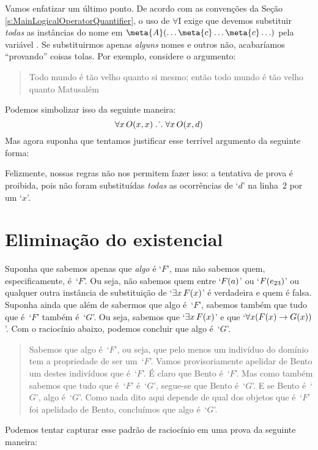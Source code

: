 Vamos enfatizar um último ponto. De acordo com as convenções da Seção \ref{s:MainLogicalOperatorQuantifier}, o uso de $\forall$I exige que devemos substituir  \emph{todas} as instâncias do nome  em $\meta{A}(\ldots \meta{c}\ldots\meta{c}\ldots)$ pela variável . Se substituirmos apenas \emph{alguns} nomes e outros não, acabaríamos ``provando'' coisas tolas. Por exemplo, considere o argumento:
	\begin{quote}
	Todo mundo é tão velho quanto si mesmo; então todo mundo é tão velho quanto Matusalém
	\end{quote}
Podemos simbolizar isso da seguinte maneira:
$$\forall x\,\mathord{O}(x,x) \mathrel{\ldotp\dot{}\,\ldotp} \forall x\,\mathord{O}(x,d)$$
Mas agora suponha que tentamos justificar esse terrível argumento da seguinte forma:
\begin{fitchproof}
\end{fitchproof}
Felizmente, nossas regras não nos permitem fazer isso: a tentativa de prova é proibida, pois não foram substituídas \emph{todas} as ocorrências de `$d$' na linha~$2$ por um `$x$'.

\section{Eliminação do existencial}
Suponha que sabemos apenas que \emph{algo}  é `$F$’, mas não sabemos quem, especificamente,  é~`$F$'.  Ou seja, não sabemos quem entre `$\mathord{F}(a)$’ ou `$\mathord{F}(e_{23})$’ ou qualquer outra instância de substituição de `$\exists x\,\mathord{F}(x)$’ é verdadeira e quem é falsa.  Suponha ainda que além de sabermos que algo  é~`$F$’, sabemos também que tudo que
é~`$F$' também é~`$G$'.  Ou seja, sabemos que `$\exists x\,\mathord{F}(x)$’ e que `$\forall x(\mathord{F}(x) \rightarrow \mathord{G}(x))$’. Com o raciocínio abaixo, podemos concluir que algo é~`$G$’.
 
\begin{quote}
Sabemos que algo é~`$F$', ou seja, que pelo menos um indivíduo do domínio tem a propriedade de ser um~`$F$'. Vamos provisoriamente apelidar de Bento um destes indivíduos que é~`$F$'. É claro que Bento é~`$F$'. Mas como também sabemos que tudo que é~`$F$' é~`$G$', segue-se que Bento é~`$G$'. E se Bento é~`$G$', algo é~`$G$'. Como nada dito aqui depende de qual dos objetos que é~`$F$’ foi apelidado de Bento, concluímos que algo é~`$G$'.		
	\end{quote}
 Podemos tentar capturar esse padrão de raciocínio em uma prova da seguinte maneira:
\begin{fitchproof}
	\open
		 
	\close
\end{fitchproof}\noindent


